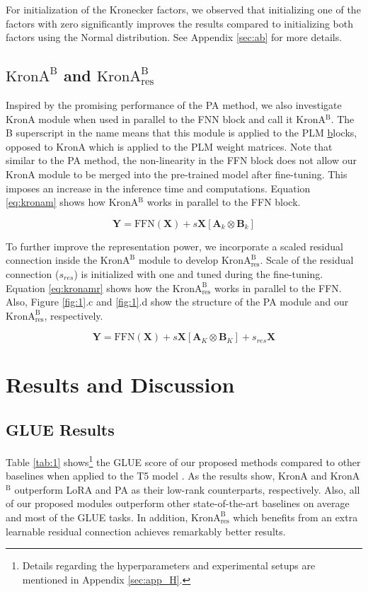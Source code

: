 For initialization of the Kronecker factors, we observed that initializing one of the factors with zero significantly improves the results compared to initializing both factors using the Normal distribution. See Appendix \ref{sec:ab} for more details.

\subsection{$\text{KronA}^\text{B}$ and $\text{KronA}^\text{B}_\text{res}$}
Inspired by the promising performance of the PA method, we also investigate KronA module when used in parallel to the FNN block and call it KronA$^\text{B}$. The B superscript in the name means that this module is applied to the PLM \underline{b}locks, opposed to KronA which is applied to the PLM weight matrices. Note that similar to the PA method, the non-linearity in the FFN block does not allow our KronA module to be merged into the pre-trained model after fine-tuning. This imposes an increase in the inference time and computations. Equation \ref{eq:kronam} shows how KronA$^\text{B}$ works in parallel to the FFN block.

\begin{equation}
\label{eq:kronam}
\mathbf{Y} = \text{FFN}(\mathbf{X}) + s\mathbf{X}[\mathbf{A}_
k\otimes \mathbf{B}_k]
\end{equation}

To further improve the representation power, we incorporate a scaled residual connection inside the $\text{KronA}^\text{B}$ module to develop $\text{KronA}^\text{B}_\text{res}$. Scale of the residual connection ($s_{res}$) is initialized with one and tuned during the fine-tuning. Equation \ref{eq:kronamr} shows how the $\text{KronA}^\text{B}_\text{res}$ works in parallel to the FFN. Also, Figure \ref{fig:1}.c and \ref{fig:1}.d show the structure of the PA module and our $\text{KronA}^\text{B}_\text{res}$, respectively.

\begin{equation}
\label{eq:kronamr}
\mathbf{Y} =  \text{FFN}(\mathbf{X}) + s\mathbf{X}[\mathbf{A}_K\otimes \mathbf{B}_K] + s_{res}\mathbf{X}
\end{equation}

\section{Results and Discussion}
\label{sec:exp}
\subsection{GLUE Results} Table \ref{tab:1} shows\footnote{Details regarding the hyperparameters and experimental setups are mentioned in Appendix \ref{sec:app_H}.} the GLUE score of our proposed methods compared to other baselines when applied to the T5 model \cite{raffel2019exploring}. As the results show, KronA and KronA$^\text{B}$ outperform LoRA and PA as their low-rank counterparts, respectively. Also, all of our proposed modules outperform other state-of-the-art baselines on average and most of the GLUE tasks. In addition, $\text{KronA}^\text{B}_\text{res}$ which benefits from an extra learnable residual connection achieves remarkably better results. 

